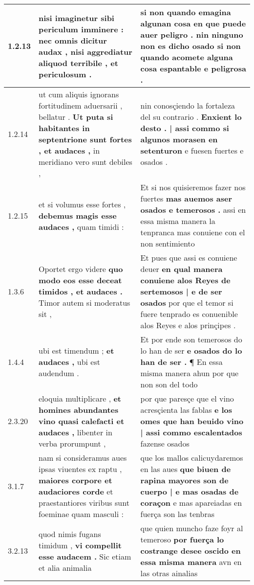 \begin{tabular}{|p{1cm}|p{6.5cm}|p{6.5cm}|}

\hline
1.2.13 & nisi imaginetur sibi periculum imminere : \textbf{ nec omnis dicitur audax , } nisi aggrediatur aliquod terribile , et periculosum . & si non quando emagina algunan cosa en que puede auer peligro . \textbf{ nin ninguno non es dicho osado } si non quando acomete alguna cosa espantable e peligrosa . \\\hline
1.2.14 & ut cum aliquis ignorans fortitudinem aduersarii , bellatur . \textbf{ Ut puta si habitantes in septentrione sunt fortes , et audaces , } in meridiano vero sunt debiles , & nin conosçiendo la fortaleza del su contrario . \textbf{ Enxient lo desto . | assi commo si algunos morasen en setenturon } e fuesen fuertes e osados . \\\hline
1.2.15 & et si volumus esse fortes , \textbf{ debemus magis esse audaces , } quam timidi : & Et si nos quisieremos fazer nos fuertes \textbf{ mas auemos aser osados e temerosos . } assi en essa misma manera la tenpranca mas conuiene con el non sentimiento \\\hline
1.3.6 & Oportet ergo videre \textbf{ quo modo eos esse deceat timidos , et audaces . } Timor autem si moderatus sit , & Et pues que assi es conuiene deuer \textbf{ en qual manera conuiene alos Reyes de sertemosos | e de ser osados } por que el temor si fuere tenprado es conuenible alos Reyes e alos prinçipes . \\\hline
1.4.4 & ubi est timendum ; \textbf{ et audaces , } ubi est audendum . & Et por ende son temerosos do lo han de ser \textbf{ e osados do lo han de ser . } ¶ En essa misma manera ahun por que non son del todo \\\hline
2.3.20 & eloquia multiplicare , \textbf{ et homines abundantes vino quasi calefacti et audaces , } libenter in verba prorumpunt , & por que paresçe que el vino acresçienta las fablas \textbf{ e los omes que han beuido vino | assi commo escalentados } fazense osados \\\hline
3.1.7 & nam si consideramus aues ipsas viuentes ex raptu , \textbf{ maiores corpore et audaciores corde } et praestantiores viribus sunt foeminae quam masculi : & que los mallos calicuydaremos en las aues \textbf{ que biuen de rapina mayores son de cuerpo | e mas osadas de coraçon } e mas apareiadas en fuerça son las tenbras \\\hline
3.2.13 & quod nimis fugans timidum , \textbf{ vi compellit esse audacem . } Sic etiam et alia animalia & que quien muncho faze foyr al temeroso \textbf{ por fuerça lo costrange desee oscido en essa misma manera } avn en las otras ainalias \\\hline

\end{tabular}
